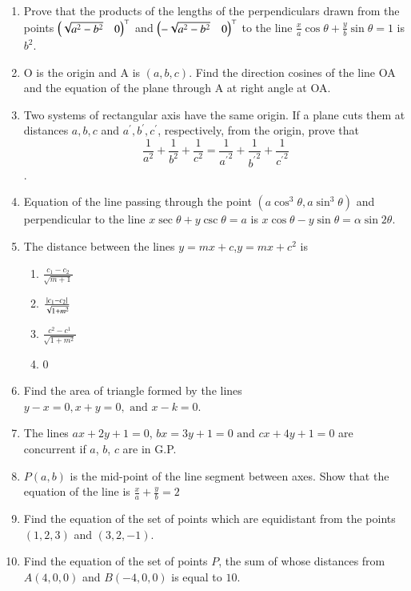 \begin{enumerate}[label=\thesubsection.\arabic*,ref=\thesubsection.\theenumi]
	\item Prove that the products of the lengths of the perpendiculars drawn from the points $\begin{pmatrix}\sqrt{a^2-b^2}& 0\end{pmatrix}^{\top}$ and $\begin{pmatrix}-\sqrt{a^2-b^2} &0\end{pmatrix}^{\top}$ to the line $\frac{x}{a} \cos{\theta} + \frac{y}{b}\sin{\theta} =1 $ is $ b^2 $.
\\
    \solution 
		
\item O is the origin and A is $(a,b,c)$. Find the direction cosines of the line OA and the equation of the plane through A at right angle at OA.
\item Two systems of rectangular axis have the same origin. If a plane cuts them at distances $a,b,c$ and $a^{\prime},b^{\prime},c^{\prime}$, respectively, from the origin, prove that $$\frac{1}{a^2}+\frac{1}{b^2}+\frac{1}{c^2}=\frac{1}{{a^{\prime}}^2}+\frac{1}{{b^{\prime}}^2}+\frac{1}{{c^{\prime}}^2}$$.
\item Equation of the line passing through the point $(a\cos^3\theta, a\sin^3\theta)$ and perpendicular to the line $x\sec\theta+y\csc\theta=a$ is $x\cos\theta-y\sin\theta=\alpha\sin2\theta$.
\item The distance between the lines $y=mx+c$,$y=mx+c^2$ is
\begin{enumerate}
\item $\frac{c_1-c_2}{\sqrt{m+1}}$
\item $\frac{\left\vert c_1-c_2\right\vert}{\sqrt{1+m^2}}$
\item $\frac{c^2-c^1}{\sqrt{1+m^2}}$
\item 0
\end{enumerate}
	\item Find the area of triangle formed by the lines $y-x=0, x+y=0, \text{ and } x-k=0$.
		\\
\solution
		
\item The lines $ax+2y+1=0$, $bx=3y+1=0\text{ and }cx+4y+1=0$ are concurrent if $a$, $b$, $c$ are in G.P.
\item 
$P(a,b)$ is the mid-point of the line segment between axes. Show that the equation of the line is $\frac{x}{a}+\frac{y}{b}=2$
\label{chapters/11/10/2/18}
\\
\solution

\item Find the equation of the set of points which are equidistant from the points $(1,2,3)$ and $(3,2,-1)$.
\item Find the equation of the set of points $P$, the sum of whose distances from $A(4,0,0)$ and $B(-4,0,0)$ is equal to $10$.

\end{enumerate}
